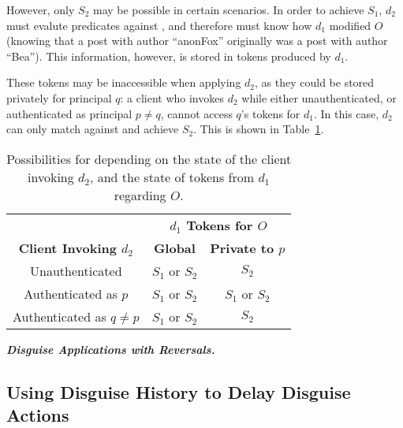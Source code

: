 However, only $S_2$ may be possible in certain scenarios.
In order to achieve $S_1$, $d_2$ must evalute predicates against \ostart, and therefore must know
how $d_1$ modified $O$ (\eg knowing that a post with author ``anonFox'' originally was a post with
author ``Bea'').  This information, however, is stored in tokens produced by $d_1$. 

These tokens may be inaccessible \sys when applying $d_2$, as they could be stored privately for
principal $q$: a client who invokes $d_2$ while either unauthenticated, or authenticated as
principal $p \neq q$, cannot access $q$'s tokens for $d_1$. 
In this case, $d_2$ can only match against \ohist{[\app{d_1}]} and achieve $S_2$.
This is shown in Table~\ref{tab:composeapp}.

\begin{table}[h]
\centering
\begin{tabular}{ c | c c }
& \multicolumn{2}{c}{\textbf{$d_1$ Tokens for $O$}}\\
\textbf{Client Invoking $d_2$ }& \textbf{Global} & \textbf{Private to $p$}\\
\hline
{Unauthenticated} & $S_1$ or $S_2$ & $S_2$\\
{Authenticated as $p$} & $S_1$ or $S_2$ & $S_1$ or $S_2$ \\
{Authenticated as $q \neq p$} & $S_1$ or $S_2$ & $S_2$
\end{tabular}
\vspace{6pt}

\caption{Possibilities for  depending on the state of the client invoking $d_2$, and the
state of tokens from $d_1$ regarding $O$.}
\label{tab:composeapp}
\end{table}

\vspace{6pt}\noindent\textbf{\emph{Disguise Applications with Reversals.}}



\subsection{Using Disguise History to Delay Disguise Actions}


